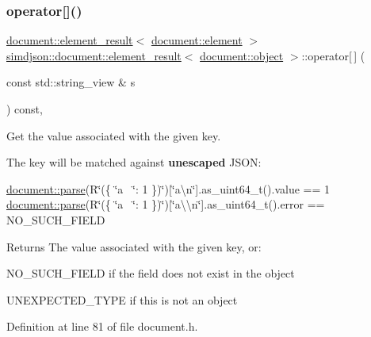\subsubsection{\texorpdfstring{operator[]()}{operator[]()}\hspace{0.1cm}{\footnotesize\ttfamily [1/2]}}
{\footnotesize\ttfamily \hyperlink{classsimdjson_1_1document_1_1element__result}{document\+::element\+\_\+result}$<$ \hyperlink{classsimdjson_1_1document_1_1element}{document\+::element} $>$ \hyperlink{classsimdjson_1_1document_1_1element__result}{simdjson\+::document\+::element\+\_\+result}$<$ \hyperlink{classsimdjson_1_1document_1_1object}{document\+::object} $>$\+::operator\mbox{[}$\,$\mbox{]} (\begin{DoxyParamCaption}\item[{const std\+::string\+\_\+view \&}]{s }\end{DoxyParamCaption}) const\hspace{0.3cm}{\ttfamily [inline]}, {\ttfamily [noexcept]}}



Get the value associated with the given key. 

The key will be matched against {\bfseries unescaped} J\+S\+ON\+:

\hyperlink{classsimdjson_1_1document_a6f11cda7c4a06fffdc00fdc97d98ae2b}{document\+::parse}(R\char`\"{}(\{ \char`\"{}a~\newline
\char`\"{}\+: 1 \})\char`\"{})\mbox{[}\char`\"{}a\textbackslash{}n\char`\"{}\mbox{]}.as\+\_\+uint64\+\_\+t().value == 1 \hyperlink{classsimdjson_1_1document_a6f11cda7c4a06fffdc00fdc97d98ae2b}{document\+::parse}(R\char`\"{}(\{ \char`\"{}a~\newline
\char`\"{}\+: 1 \})\char`\"{})\mbox{[}\char`\"{}a\textbackslash{}\textbackslash{}n\char`\"{}\mbox{]}.as\+\_\+uint64\+\_\+t().error == N\+O\+\_\+\+S\+U\+C\+H\+\_\+\+F\+I\+E\+LD

\begin{DoxyReturn}{Returns}
The value associated with the given key, or\+:
\begin{DoxyItemize}
\item N\+O\+\_\+\+S\+U\+C\+H\+\_\+\+F\+I\+E\+LD if the field does not exist in the object
\item U\+N\+E\+X\+P\+E\+C\+T\+E\+D\+\_\+\+T\+Y\+PE if this is not an object 
\end{DoxyItemize}
\end{DoxyReturn}


Definition at line 81 of file document.\+h.


